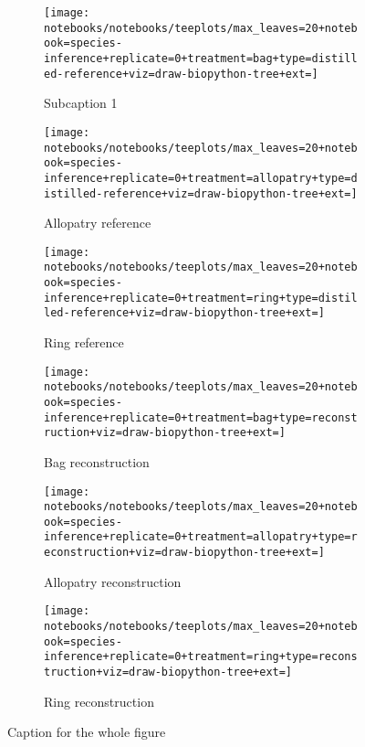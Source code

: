 \begin{sidewaysfigure}

  \begin{subfigure}{.33\linewidth}
    \centering
    \texttt{[image: notebooks/notebooks/teeplots/max\_leaves=20+notebook=species-inference+replicate=0+treatment=bag+type=distilled-reference+viz=draw-biopython-tree+ext=]}
    \caption{Subcaption 1}
    \label{fig:species-example-replicates:bag-reference}
  \end{subfigure}
  \begin{subfigure}{.33\linewidth}
    \centering
    \texttt{[image: notebooks/notebooks/teeplots/max\_leaves=20+notebook=species-inference+replicate=0+treatment=allopatry+type=distilled-reference+viz=draw-biopython-tree+ext=]}
    \caption{Allopatry reference}
    \label{fig:species-example-replicates:allopatry-reference}
  \end{subfigure}
  \begin{subfigure}{.33\linewidth}
    \centering
    \texttt{[image: notebooks/notebooks/teeplots/max\_leaves=20+notebook=species-inference+replicate=0+treatment=ring+type=distilled-reference+viz=draw-biopython-tree+ext=]}
    \caption{Ring reference}
    \label{fig:species-example-replicates:ring-reference}
  \end{subfigure}

  \begin{subfigure}{.33\linewidth}
    \centering
    \texttt{[image: notebooks/notebooks/teeplots/max\_leaves=20+notebook=species-inference+replicate=0+treatment=bag+type=reconstruction+viz=draw-biopython-tree+ext=]}
    \caption{Bag reconstruction}
    \label{fig:species-example-replicates:bag-reconstruction}
  \end{subfigure}
  \begin{subfigure}{.33\linewidth}
    \centering
    \texttt{[image: notebooks/notebooks/teeplots/max\_leaves=20+notebook=species-inference+replicate=0+treatment=allopatry+type=reconstruction+viz=draw-biopython-tree+ext=]}
    \caption{Allopatry reconstruction}
    \label{fig:species-example-replicates:allopatry-reconstruction}
  \end{subfigure}
  \begin{subfigure}{.33\linewidth}
    \centering
    \texttt{[image: notebooks/notebooks/teeplots/max\_leaves=20+notebook=species-inference+replicate=0+treatment=ring+type=reconstruction+viz=draw-biopython-tree+ext=]}
    \caption{Ring reconstruction}
    \label{fig:species-example-replicates:ring-reconstruction}
  \end{subfigure}

  \caption{Caption for the whole figure}
  \label{fig:species-example-replicates}

\end{sidewaysfigure}
